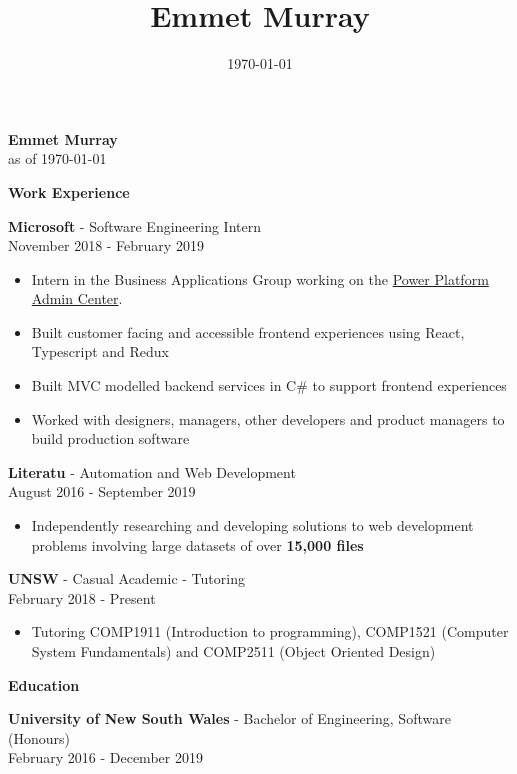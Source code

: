 \documentclass[a4paper]{article}
\title{\textbf{Emmet Murray}}
\date{\today}
\newcommand{\minititle}[1]{{\Large \begin{center} \textbf{#1} \end{center}} \vspace{0.2cm}}
\newcommand{\resumeEntry}[3]{{\large \textbf{#1} - #2} \\ \small{#3} }
\begin{document}
 

\begin{minipage}[t]{0.6\linewidth}   
    {
        \begin{center}
            { \Huge \textbf{Emmet Murray}} \\
            \vspace{0.4cm}
            as of \today
        \end{center}
        \minititle{Work Experience}
        \resumeEntry{Microsoft}{Software Engineering Intern}{November 2018 - February 2019}
        \begin{itemize}
            \setlength\itemsep{0.03cm}
            \item Intern in the Business Applications Group working on the \href{https://blogs.msdn.microsoft.com/crm/2018/09/25/introducing-the-power-platform-admin-center/}{Power Platform Admin Center}.
            \item Built customer facing and accessible frontend experiences using React, Typescript and Redux
            \item Built MVC modelled backend services in C\# to support frontend experiences 
            \item Worked with designers, managers, other developers and product managers to build production software
        \end{itemize}
        \vspace{0.3cm}
        \resumeEntry{Literatu}{Automation and Web Development}{August 2016 - September 2019}
        \begin{itemize}
            \setlength\itemsep{0.03cm}
            \item Independently researching and developing solutions to web development problems involving large datasets of over \textbf{15,000 files}
        \end{itemize}
        \vspace{0.3cm}
        \resumeEntry{UNSW}{Casual Academic - Tutoring}{February 2018 - Present}
        \begin{itemize}
            \setlength\itemsep{0.03cm}
            \item Tutoring COMP1911 (Introduction to programming), COMP1521 (Computer System Fundamentals) and COMP2511 (Object Oriented Design)
        \end{itemize}
    }
    {
        \minititle{Education}
        \resumeEntry{University of New South Wales}{Bachelor of Engineering, Software (Honours)}{February 2016 - December 2019}
}
\end{minipage}
\end{document}
